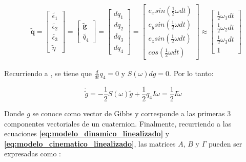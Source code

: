 \begin{equation}
	\begin{aligned}		
		& \boldsymbol{\tilde{q}} = \left[\begin{array}{c}				
				\tilde{\epsilon_1}\\
				\tilde{\epsilon_2}\\
				\tilde{\epsilon_3} \\
				\tilde{\eta}
			\end{array}\right] =
			\left[\begin{array}{c}
				\boldsymbol{\tilde{g}}\\				
				\tilde{q_4}
			\end{array}\right] =
				\left[\begin{array}{c}
				dq_1\\				
				dq_2\\
				dq_3\\
				dq_4
			\end{array}\right] =
				\left[\begin{array}{c}
					e_x sin\left(\frac{1}{2}\omega dt\right)\\
					e_y sin\left(\frac{1}{2}\omega dt\right)\\
					e_z sin\left(\frac{1}{2}\omega dt\right)\\
					cos\left(\frac{1}{2}\omega dt\right)
				\end{array}\right]\approx
				\left[\begin{array}{c}
					\frac{1}{2}\omega_1 dt\\				
					\frac{1}{2}\omega_2 dt\\
					\frac{1}{2}\omega_3 dt\\
					1
				\end{array}\right]						
	\end{aligned}	
\end{equation}

\noindent Recurriendo a \cite{Blanke2010}, se tiene que $\frac{d}{dt}q_4 = 0$ y $S(\omega)dg =0$. Por lo tanto:

\begin{equation}\label{eq:modelo_cinematico_linealizado}
	\dot{\tilde{g}} = -\frac{1}{2}S(\omega)\tilde{g}+\frac{1}{2}q_4I\omega = \frac{1}{2}I\tilde{\omega}
\end{equation}

Donde $g$ se conoce como vector de Gibbs y corresponde a las primeras 3 componentes vectoriales de un cuaternion. Finalmente, recurriendo a las ecuaciones \textbf{\eqref{eq:modelo_dinamico_linealizado}} y \textbf{\eqref{eq:modelo_cinematico_linealizado}}, las matrices $A$, $B$ y $\Gamma$ pueden ser expresadas como :

